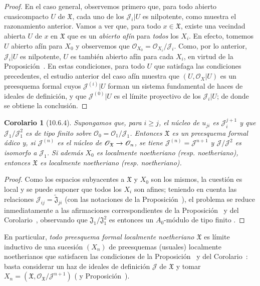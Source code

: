 \documentclass[oneside]{amsart}
\theoremstyle{ega-env-style}
\theoremstyle{ega-thm-env-style}
\newtheorem*{corollary}{Corolario}
\theoremstyle{ega-defn-env-style}
\def\geq{\geqslant}                 %
\renewcommand{\to}{\mathchoice{\longrightarrow}{\rightarrow}{\rightarrow}{\rightarrow}}
\newcommand{\oldpage}[2][]{{\marginnote{\normalfont{\textbf{#1}~|~#2}}}\ignorespaces}
\let\EGAOriginalLabel\label
\renewcommand{\label}[1]{\phantomsection\EGAOriginalLabel{#1}}
\begin{document}
\begin{proof}
En el caso general, observemos primero que, para todo abierto cuasicompacto $U$ de $\mathfrak{X}$, cada uno de los $\mathscr{J}_i|U$ es nilpotente, como muestra el razonamiento anterior.
Vamos a ver que, para todo $x\in\mathfrak{X}$, existe una vecindad abierta $U$ de $x$ en $\mathfrak{X}$ que es un \emph{abierto afín} para \emph{todos} los $X_i$.
En efecto, tomemos $U$ abierto afín para $X_0$ y observemos que $\mathscr{O}_{X_0}=\mathscr{O}_{X_i}/\mathscr{J}_i$.
Como, por lo anterior, $\mathscr{J}_i|U$ es nilpotente, $U$ es también abierto afín para cada $X_i$, en virtud de la Proposición~.
En estas condiciones, para todo $U$ que satisfaga las condiciones precedentes, el estudio anterior del caso afín muestra que $(U,\mathscr{O}_X|U)$ es un preesquema formal cuyos $\mathscr{J}^{(i)}|U$ forman un sistema fundamental de haces de ideales de definición, y que $\mathscr{J}^{(0)}|U$ es el límite proyectivo de los $\mathscr{J}_i|U$; de donde se obtiene la conclusión.
\end{proof}

\begin{corollary}[10.6.4]
\label{I.10.6.4}
Supongamos que, para $i\geq j$, el núcleo de $u_{ji}$ es $\mathscr{J}_i^{j+1}$ y que $\mathscr{J}_1/\mathscr{J}_1^2$
\oldpage[I]{191}
es de tipo finito sobre $\mathscr{O}_0=\mathscr{O}_1/\mathscr{J}_1$.
Entonces $\mathfrak{X}$ es un preesquema formal ádico y, si $\mathscr{J}^{(n)}$ es el núcleo de $\mathscr{O}_{\mathfrak{X}}\to\mathscr{O}_n$, se tiene $\mathscr{J}^{(n)}=\mathscr{J}^{n+1}$ y $\mathscr{J}/\mathscr{J}^2$ es isomorfo a $\mathscr{J}_1$.
Si además $X_0$ es localmente noetheriano \textup{(resp.} noetheriano), entonces $\mathfrak{X}$ es localmente noetheriano \textup{(resp.} noetheriano).
\end{corollary}

\begin{proof}
Como los espacios subyacentes a $\mathfrak{X}$ y $X_0$ son los mismos, la cuestión es local y se puede suponer que todos los $X_i$ son afines; teniendo en cuenta las relaciones $\mathscr{J}_{ij}=\widetilde{\mathfrak{J}}_{ji}$ (con las notaciones de la Proposición~), el problema se reduce inmediatamente a las afirmaciones correspondientes de la Proposición~ y del Corolario~, observando que $\mathfrak{J}_1/\mathfrak{J}_1^2$ es entonces un $A_0$-módulo de tipo finito .
\end{proof}

En particular, \emph{todo preesquema formal localmente noetheriano $\mathfrak{X}$} es límite inductivo de una sucesión $(X_n)$ de preesquemas (usuales) localmente noetherianos que satisfacen las condiciones de la Proposición~ y del Corolario~: basta considerar un haz de ideales de definición $\mathscr{J}$ de $\mathfrak{X}$  y tomar $X_n=(\mathfrak{X},
\mathscr{O}_{\mathfrak{X}}/\mathscr{J}^{n+1})$ ( y Proposición~).
\end{document}
